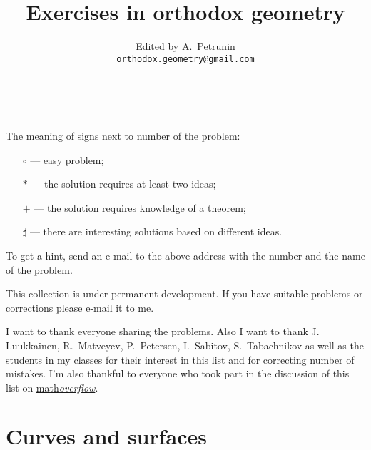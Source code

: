 \documentclass[twoside]{book}
\begin{document}
\title{Exercises in orthodox geometry}
\author{Edited by A.~Petrunin\\
\small{\tt orthodox.geometry@gmail.com}
}

\date{}
\maketitle


\tableofcontents

\ 

 The meaning of signs next to number of the problem:
\begin{itemize}
\item[$\circ$] --- easy problem;%
\item[$*$] --- the solution requires at least two ideas;%
\item[{\small$+$}] --- the solution requires knowledge of a theorem;%
\item[$\sharp$] --- there are interesting solutions based on different ideas.%
\end{itemize}
To get a hint, send an e-mail to the above address 
with the number and the name of the problem.

This collection is under permanent development.
If you have suitable problems or corrections please e-mail it to me.


 I want to thank everyone sharing the problems.
Also I want to thank 
J. Luukkainen,
R.~Matveyev, 
P.~Petersen, 
I.~Sabitov,
S.~Tabachnikov 
as well as the students in my classes for their interest in this list and for correcting number of mistakes.
I'm also thankful to everyone who took part in the discussion of this list on \href{http://mathoverflow.net/questions/8247}{math\textit{overflow}}.









\chapter{Curves and surfaces}

\end{document}
